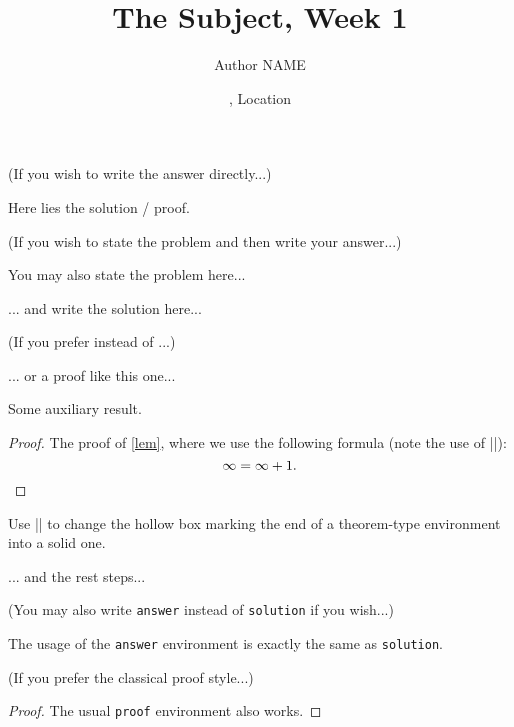 \documentclass[11pt,
  logo = {example-image},
  title in boldface,
  theorem in new line,
]{homework}
\title{The Subject, Week 1}
\author{Author NAME}
\date{\TheDate{2023-12-25}, Location}
\begin{document}
\bigskip\textcolor{gray!55}{(If you wish to write the answer directly...)}

\begin{problem}
    Here lies the solution / proof.
\end{problem}


\bigskip\textcolor{gray!55}{(If you wish to state the problem and then write your answer...)}

\begin{problem}
    You may also state the problem here...
\end{problem}

\begin{solution}
    ... and write the solution here...
\end{solution}

\bigskip\textcolor{gray!55}{(If you prefer  instead of ...)}

\begin{solution}[Proof]
    ... or a proof like this one...
    \begin{lemma}\label{lem}
        Some auxiliary result.
    \end{lemma}
    \begin{proof}
        The proof of \cref{lem}, where we use the following formula (note the use of \cverb|\qedhere|):
        \[
            \infty = \infty + 1.
            \qedhere %
        \]
    \end{proof}
    \begin{fact}
        \proofless
        Use \cverb|\proofless| to change the hollow box marking the end of a theorem-type environment into a solid one.
    \end{fact}
    ... and the rest steps...
\end{solution}


\bigskip\textcolor{gray!55}{(You may also write \texttt{answer} instead of \texttt{solution} if you wish...)}

\begin{answer}
    The usage of the \verb|answer| environment is exactly the same as \verb|solution|.
\end{answer}


\pagebreak


\bigskip\textcolor{gray!55}{(If you prefer the classical proof style...)}

\begin{proof}
    The usual \verb|proof| environment also works.
\end{proof}
\end{document}
